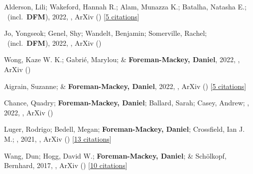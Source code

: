 \item[{\color{numcolor}\scriptsize10}] Alderson, Lili; Wakeford, Hannah R.; Alam, Munazza K.; Batalha, Natasha E.; \etal\ (incl.\ \textbf{DFM}), 2022, , ArXiv () [\href{https://ui.adsabs.harvard.edu/abs/2022arXiv221110488A}{5 citations}]

\item[{\color{numcolor}\scriptsize9}] Jo, Yongseok; Genel, Shy; Wandelt, Benjamin; Somerville, Rachel; \etal\ (incl.\ \textbf{DFM}), 2022, , ArXiv ()

\item[{\color{numcolor}\scriptsize8}] Wong, Kaze W. K.; Gabri{\'e}, Marylou; \& \textbf{Foreman-Mackey, Daniel}, 2022, , ArXiv ()

\item[{\color{numcolor}\scriptsize7}] Aigrain, Suzanne; \& \textbf{Foreman-Mackey, Daniel}, 2022, , ArXiv () [\href{https://ui.adsabs.harvard.edu/abs/2022arXiv220908940A}{5 citations}]

\item[{\color{numcolor}\scriptsize6}] Chance, Quadry; \textbf{Foreman-Mackey, Daniel}; Ballard, Sarah; Casey, Andrew; \etal, 2022, , ArXiv ()

\item[{\color{numcolor}\scriptsize5}] Luger, Rodrigo; Bedell, Megan; \textbf{Foreman-Mackey, Daniel}; Crossfield, Ian J. M.; \etal, 2021, , ArXiv () [\href{https://ui.adsabs.harvard.edu/abs/2021arXiv211006271L}{13 citations}]

\item[{\color{numcolor}\scriptsize4}] Wang, Dun; Hogg, David W.; \textbf{Foreman-Mackey, Daniel}; \& Sch{\"o}lkopf, Bernhard, 2017, , ArXiv () [\href{https://ui.adsabs.harvard.edu/abs/2017arXiv171002428W}{10 citations}]

